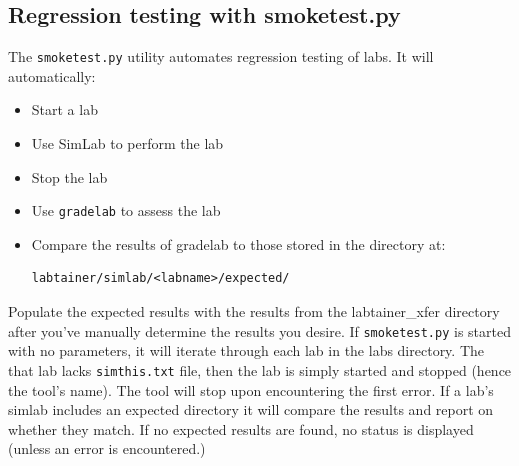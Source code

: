 \documentclass[12pt]{article}
\begin{document}
\subsection{Regression testing with smoketest.py} \label{smoketest}
The {\tt smoketest.py} utility automates regression testing of labs.  It will automatically:
\begin{itemize}
\item Start a lab
\item Use SimLab to perform the lab
\item Stop the lab
\item Use {\tt gradelab} to assess the lab
\item Compare the results of gradelab to those stored in the directory at:
\begin{verbatim}
labtainer/simlab/<labname>/expected/
\end{verbatim}
\end{itemize}
\noindent Populate the expected results with the results from the labtainer\_xfer directory after you've
manually determine the results you desire.
If {\tt smoketest.py} is started with no parameters, it will iterate through each lab in the labs
directory.  The that lab lacks {\tt simthis.txt} file, then the lab is simply started and stopped
(hence the tool's name).  The tool will stop upon encountering the first error.
If a lab's simlab includes an expected directory it will compare the results and report on whether they match.
If no expected results are found, no status is displayed (unless an error is encountered.)
\end{document}
